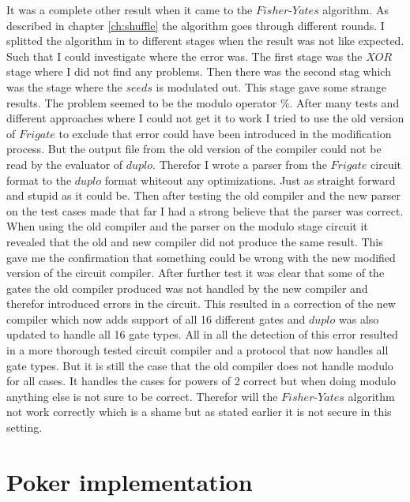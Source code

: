 It was a complete other result when it came to the $Fisher\text{-}Yates$ algorithm. As described in chapter \ref{ch:shuffle} the algorithm goes through different rounds. I splitted the algorithm in to different stages when the result was not like expected. Such that I could investigate where the error was. The first stage was the $XOR$ stage where I did not find any problems. Then there was the second stag which was the stage where the $seeds$ is modulated out. This stage gave some strange results. The problem seemed to be the modulo operator $\%$. After many tests and different approaches where I could not get it to work I tried to use the old version of $Frigate$ to exclude that error could have been introduced in the modification process. But the output file from the old version of the compiler could not be read by the evaluator of $duplo$. Therefor I wrote a parser from the $Frigate$ circuit format to the $duplo$ format whiteout any optimizations. Just as straight forward and stupid as it could be. Then after testing the old compiler and the new parser on the test cases made that far I had a strong believe that the parser was correct. When using the old compiler and the parser on the modulo stage circuit it revealed that the old and new compiler did not produce the same result. This gave me the confirmation that something could be wrong with the new modified version of the circuit compiler. After further test it was clear that some of the gates the old compiler produced was not handled by the new compiler and therefor introduced errors in the circuit. This resulted in a correction of the new compiler which now adds support of all 16 different gates and $duplo$ was also updated to handle all 16 gate types. All in all the detection of this error resulted in a more thorough tested circuit compiler and a protocol that now handles all gate types. But it is still the case that the old compiler does not handle modulo for all cases. It handles the cases for powers of 2 correct but when doing modulo anything else is not sure to be correct. Therefor will the $Fisher\text{-}Yates$ algorithm not work correctly which is a shame but as stated earlier it is not secure in this setting.




\section{Poker implementation}


